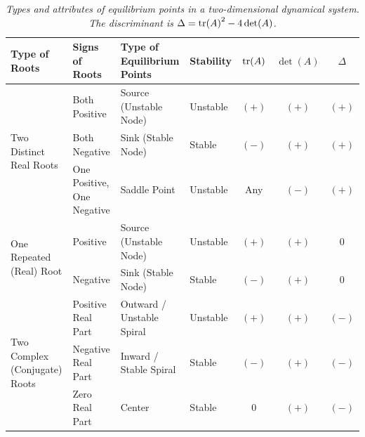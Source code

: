 \begin{table}[ht!]
    \centering
    \small
    \begin{tabular}{|p{40pt}|p{48pt}|p{68pt}|p{44pt}|c|c|c|}
    \hline
    Type of Roots & Signs of Roots & Type of Equilibrium Points & Stability & $\tr(A)$ & $\det(A)$ & $\Delta$ \\
    \hline
    \multirow{3}{40pt}{Two Distinct Real Roots} & Both Positive & Source (Unstable Node) & Unstable & $(+)$ & $(+)$ & $(+)$ \\
    \hhline{~------}
     & Both Negative & Sink (Stable Node) & Stable & $(-)$ & $(+)$ & $(+)$ \\
    \hhline{~------} 
    & One Positive, One Negative & Saddle Point & Unstable & Any & $(-)$ & $(+)$ \\
    \hline
    \multirow{2}{40pt}{One Repeated (Real) Root} & Positive & Source (Unstable Node) & Unstable & $(+)$ & $(+)$ & $0$ \\
    \hhline{~------}
     & Negative & Sink (Stable Node) & Stable & $(-)$ & $(+)$ & $0$ \\
    \hline
    \multirow{3}{40pt}{Two Complex (Conjugate) Roots} & Positive Real Part & Outward / Unstable Spiral & Unstable & $(+)$ & $(+)$ & $(-)$ \\
    \hhline{~------}
     & Negative Real Part & Inward / Stable Spiral & Stable & $(-)$ & $(+)$ & $(-)$ \\
    \hhline{~------} 
    & Zero Real Part & Center & Stable & $0$ & $(+)$ & $(-)$ \\
    \hline
    \end{tabular}
    \caption{\textit{Types and attributes of equilibrium points in a two-dimensional dynamical system. The discriminant is $\Delta = \tr(A)^2 - 4\det(A)$.}}
    \label{tab:equilpts}
\end{table}


